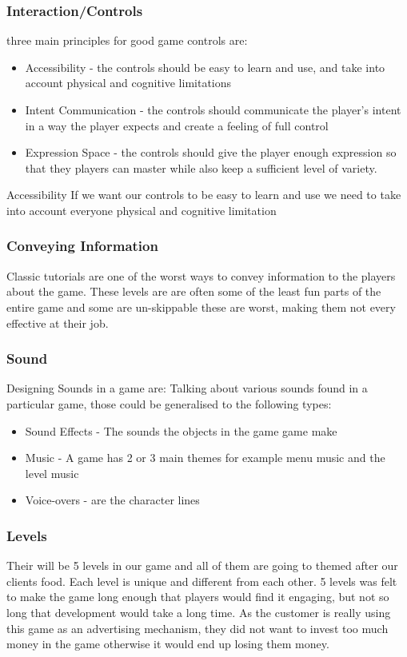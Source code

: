 \documentclass{article}
\begin{document}
\subsubsection{Interaction/Controls}
three main principles for good game controls are:
\begin{itemize}
	\item Accessibility - the controls should be easy to learn and use, and take into account physical and cognitive limitations
	\item Intent Communication - the controls should communicate the player's intent in a way the player expects and create a feeling of full control
	\item Expression Space - the controls should give the player enough expression so that they players can master while also keep a sufficient level of variety.
\end{itemize}

Accessibility 
If we want our controls to be easy to learn and use we need to take into account everyone physical and cognitive limitation 

\subsubsection{Conveying Information}
Classic tutorials are one of the worst ways to convey information to the players about the game. These levels are are often some of the least fun parts of the entire game and some are un-skippable these are worst, making them not every effective at their job.

\subsubsection{Sound}
Designing Sounds in a game are:
Talking about various sounds found in a particular game, those could be generalised to the following types: 
\begin{itemize}
	\item Sound Effects - The sounds the objects in the game game make
	\item Music -  A game has 2 or 3 main themes for example menu music and the level music
	\item Voice-overs - are the character lines
\end{itemize}

\subsubsection{Levels}
Their will be 5 levels in our game and all of them are going to themed after our clients food. Each level is unique and different from each other. 5 levels was felt to make the game long enough that players would find it engaging, but not so long that development would take a long time. As the customer is really using this game as an advertising mechanism, they did not want to invest too much money in the game otherwise it would end up losing them money.
\end{document}
